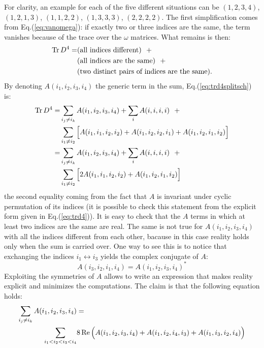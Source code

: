 \documentclass[12pt,a4paper]{article}
\DeclareMathOperator{\Tr}{Tr}
\DeclareMathOperator{\Real}{Re}
\begin{document}
For clarity, an example for each of the five different situations can be $(1, 2, 3, 4)$, $(1, 2, 1, 3)$, $(1, 1, 2, 2)$, $(1, 3, 3, 3)$, $(2, 2, 2, 2)$. \newline
The first simplification comes from Eq.(\ref{eq:vanomega}): if exactly two or three indices are the same, the term vanishes because of the trace over the $\omega$ matrices. What remains is then:
\begin{align}\label{eq:trd4splitsch}
\Tr D^4 = &(\text{all indices different}) \ \ + \notag \\
&(\text{all indices are the same}) \ \ + \notag \\
&(\text{two distinct pairs of indices are the same}).
\end{align}
By denoting $A(i_1, i_2, i_3, i_4)$ the generic term in the sum, Eq.(\ref{eq:trd4splitsch}) is:
\begin{align}\label{eq:trd4split}
\Tr D^4 = &\sum_{i_j \neq i_k} A(i_1, i_2, i_3, i_4) + \sum_{i} A(i,i,i,i) \ \ + \notag \\
&\sum_{i_1 \neq i_2} \Big[ A(i_1, i_1, i_2, i_2) + A(i_1, i_2, i_2, i_1)  + A(i_1, i_2, i_1, i_2) \Big] \notag \\
= &\sum_{i_j \neq i_k} A(i_1, i_2, i_3, i_4) + \sum_{i} A(i,i,i,i) \ \ + \notag \\
&\sum_{i_1 \neq i_2} \Big[ 2A(i_1, i_1, i_2, i_2) + A(i_1, i_2, i_1, i_2) \Big]
\end{align}
the second equality coming from the fact that $A$ is invariant under cyclic permutation of its indices (it is possible to check this statement from the explicit form given in Eq.(\ref{eq:trd4})). \newline
It is easy to check that the $A$ terms in which at least two indices are the same are real. The same is not true for $A(i_1, i_2, i_3, i_4)$ with all the indices different from each other, bacause in this case reality holds only when the sum is carried over. One way to see this is to notice that exchanging the indices $i_1 \leftrightarrow i_3$ yields the complex conjugate of $A$:
\begin{equation}
A(i_3, i_2, i_1, i_4) = A(i_1, i_2, i_3, i_4)^*
\end{equation}
Exploiting the symmetries of $A$ allows to write an expression that makes reality explicit and minimizes the computations. The claim is that the following equation holds:
\begin{align}\label{eq:group}
\sum_{i_j \neq i_k} A(i_1, i_2, i_3, i_4) &= \notag \\
 \sum_{i_1 < i_2 < i_3 < i_4} &8 \Real \Big( A(i_1, i_2, i_3, i_4) + A(i_1, i_2, i_4, i_3) + A(i_1, i_3, i_2, i_4) \Big)
\end{align}
\end{document}
